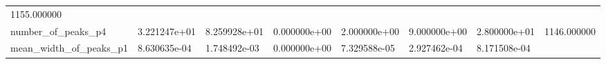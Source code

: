 \documentclass[11pt]{article}
\begin{document}
\begin{longtable}[]{@{}llllllll@{}}
\begin{minipage}[t]{0.08\columnwidth}
1155.000000\strut
\end{minipage}\tabularnewline
\begin{minipage}[t]{0.16\columnwidth}\raggedright
number\_of\_peaks\_p4\strut
\end{minipage} & \begin{minipage}[t]{0.09\columnwidth}\raggedright
3.221247e+01\strut
\end{minipage} & \begin{minipage}[t]{0.09\columnwidth}\raggedright
8.259928e+01\strut
\end{minipage} & \begin{minipage}[t]{0.09\columnwidth}\raggedright
0.000000e+00\strut
\end{minipage} & \begin{minipage}[t]{0.09\columnwidth}\raggedright
2.000000e+00\strut
\end{minipage} & \begin{minipage}[t]{0.09\columnwidth}\raggedright
9.000000e+00\strut
\end{minipage} & \begin{minipage}[t]{0.09\columnwidth}\raggedright
2.800000e+01\strut
\end{minipage} & \begin{minipage}[t]{0.08\columnwidth}\raggedright
1146.000000\strut
\end{minipage}\tabularnewline
\begin{minipage}[t]{0.16\columnwidth}\raggedright
mean\_width\_of\_peaks\_p1\strut
\end{minipage} & \begin{minipage}[t]{0.09\columnwidth}\raggedright
8.630635e-04\strut
\end{minipage} & \begin{minipage}[t]{0.09\columnwidth}\raggedright
1.748492e-03\strut
\end{minipage} & \begin{minipage}[t]{0.09\columnwidth}\raggedright
0.000000e+00\strut
\end{minipage} & \begin{minipage}[t]{0.09\columnwidth}\raggedright
7.329588e-05\strut
\end{minipage} & \begin{minipage}[t]{0.09\columnwidth}\raggedright
2.927462e-04\strut
\end{minipage} & \begin{minipage}[t]{0.09\columnwidth}\raggedright
8.171508e-04\strut
\end{minipage} & \begin{minipage}[t]{0.08\columnwidth}\raggedright

\end{minipage}
\end{longtable}
\end{document}
